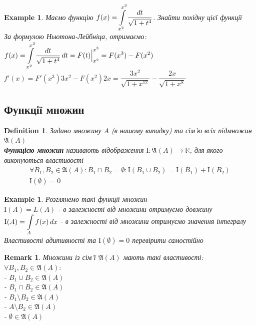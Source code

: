 \documentclass[a4paper, 14pt]{extarticle}
\def\huge{\displaystyle}
\theoremstyle{theoremdd}
\theoremstyle{theoremdd}
\newtheorem{definition}[theorem]{Definition}
\theoremstyle{theoremdd}
\theoremstyle{theoremdd}
\newtheorem{example}[theorem]{Example}
\theoremstyle{theoremdd}
\theoremstyle{theoremdd}
\newtheorem{remark}[theorem]{Remark}
\theoremstyle{theoremdd}
\theoremstyle{theoremdd}
\begin{document}
\begin{example}
Маємо функцію $f(x) = \huge\int\displaylimits_{x^2}^{x^3} \dfrac{dt}{\sqrt{1+t^4}}$. Знайти похідну цієї функції\\
За формулою Ньютона-Лейбніца, отримаємо:\\
$f(x) = \huge\int\displaylimits_{x^2}^{x^3} \dfrac{dt}{\sqrt{1+t^4}}\,dt = F(t) \Big|_{x^2}^{x^3} = F(x^3) - F(x^2)$\\
$f'(x) = F'(x^3) 3x^2 - F(x^2) 2x = \dfrac{3x^2}{\sqrt{1+x^{12}}} - \dfrac{2x}{\sqrt{1+x^8}}$
\end{example}


\subsection{Функції множин}
\begin{definition}
Задано множину $A$ (в нашому випадку) та сім'ю всіх підмножин $\mathfrak{A}(A)$\\
\textbf{Функцією множин} називають відображення $\mathrm{I}: \mathfrak{A}(A) \to \mathbb{R}$, для якого виконуються властивості
\begin{align*}
\forall B_1,B_2 \in \mathfrak{A}(A): B_1 \cap B_2 = \emptyset: \mathrm{I}(B_1 \cup B_2) = \mathrm{I}(B_1) + \mathrm{I}(B_2)\\
\mathrm{I}(\emptyset) = 0
\end{align*}
\end{definition}

\begin{example} Розглянемо такі функції множин\\
$\mathrm{I}(A) = L(A)$ - в залежності від множини отримуємо довжину\\
$\mathrm{I}(A) = \huge\int\displaylimits_A f(x)\,dx$ - в залежності від множини отримуємо значення інтегралу\\
\textit{Властивості адитивності та} $\mathrm{I}(\emptyset) = 0$ \textit{перевірити самостійно}
\end{example}

\begin{remark}
Множини із сім'ї $\mathfrak{A}(A)$ мають такі властивості: \\ $\forall B_1,B_2 \in \mathfrak{A}(A):$\\
- $B_1 \cup B_2 \in \mathfrak{A}(A)$\\
- $B_1 \cap B_2 \in \mathfrak{A}(A)$\\
- $B_1 \setminus B_2 \in \mathfrak{A}(A)$\\
- $A \setminus B_2 \in \mathfrak{A}(A)$\\
- $\emptyset \in \mathfrak{A}(A)$\\
\end{remark}
\end{document}

